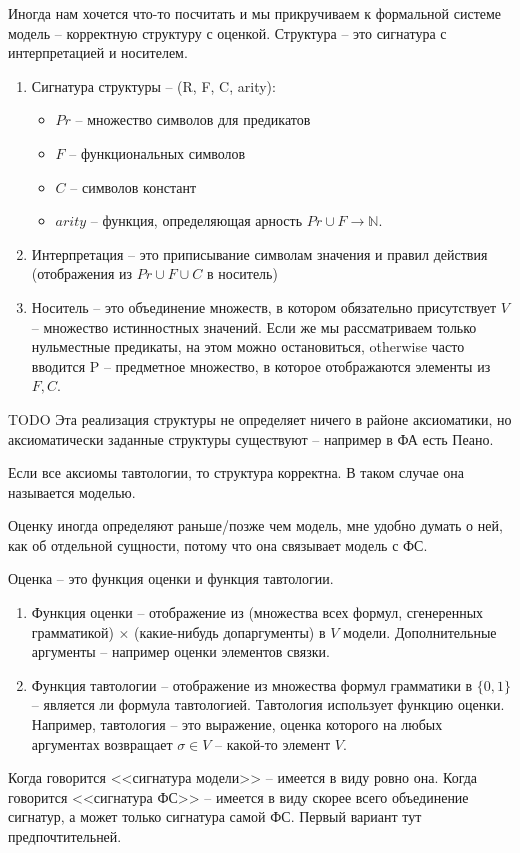 Иногда нам хочется что-то посчитать и мы прикручиваем к
формальной системе модель -- корректную структуру с оценкой.
Структура -- это сигнатура с интерпретацией и носителем.
\begin{enumerate}
    \item Сигнатура структуры -- (R, F, C, arity):
    \begin{itemize}
        \item $Pr$ -- множество символов для предикатов
        \item $F$ -- функциональных символов
        \item $C$ -- символов констант
        \item $arity$ – функция, определяющая арность $Pr \cup F \to \mathbb N$.
    \end{itemize}
    \item Интерпретация -- это приписывание символам значения
    и правил действия (отображения из $Pr \cup F \cup C$ в носитель)
    \item Носитель -- это объединение множеств, в котором обязательно
    присутствует $V$ -- множество истинностных значений. Если же
    мы рассматриваем только нульместные предикаты, на этом
    можно остановиться, otherwise часто вводится P -- предметное
    множество, в которое отображаются элементы из $F, C$.
\end{enumerate}
TODO Эта реализация структуры не определяет ничего в районе
аксиоматики, но аксиоматически заданные структуры существуют
– например в ФА есть Пеано.

Если все аксиомы тавтологии, то структура корректна.
В таком случае она называется моделью.

Оценку иногда определяют раньше/позже чем модель, мне
удобно думать о ней, как об отдельной сущности, потому что
она связывает модель с ФС.

Оценка -- это функция оценки и функция тавтологии.
\begin{enumerate}
    \item Функция оценки -- отображение из (множества всех формул,
        сгенеренных грамматикой) $\times$ (какие-нибудь допаргументы)
        в $V$ модели. Дополнительные аргументы -- например оценки
        элементов связки.
    \item Функция тавтологии -- отображение из множества формул
        грамматики в $\{0, 1\}$ -- является ли формула тавтологией.
        Тавтология использует функцию оценки. Например, тавтология
        -- это выражение, оценка которого на любых аргументах
        возвращает $\sigma \in V$ -- какой-то элемент $V$.
\end{enumerate}

Когда говорится <<сигнатура модели>> -- имеется в виду ровно она.
Когда говорится <<сигнатура ФС>> -- имеется в виду скорее всего
объединение сигнатур, а может только сигнатура самой ФС. Первый
вариант тут предпочтительней.
